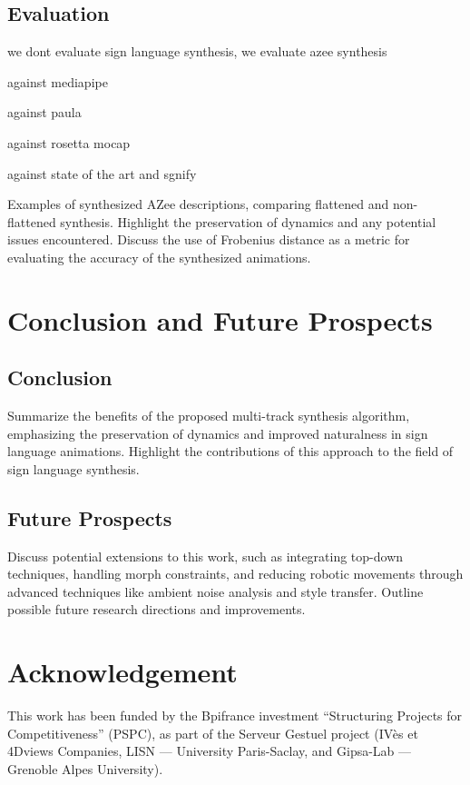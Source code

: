 \documentclass[../../main.tex]{subfiles}
\begin{document}
\subsection{Evaluation}

we dont evaluate sign language synthesis, we evaluate azee synthesis

against mediapipe 

against paula

against rosetta mocap

against state of the art and sgnify

Examples of synthesized AZee descriptions, comparing flattened and non-flattened synthesis. Highlight the preservation of dynamics and any potential issues encountered. Discuss the use of Frobenius distance as a metric for evaluating the accuracy of the synthesized animations.

\section{Conclusion and Future Prospects}

\subsection{Conclusion}
Summarize the benefits of the proposed multi-track synthesis algorithm, emphasizing the preservation of dynamics and improved naturalness in sign language animations. Highlight the contributions of this approach to the field of sign language synthesis.

\subsection{Future Prospects}
Discuss potential extensions to this work, such as integrating top-down techniques, handling morph constraints, and reducing robotic movements through advanced techniques like ambient noise analysis and style transfer. Outline possible future research directions and improvements.

\section{Acknowledgement}
This work has been funded by the Bpifrance investment “Structuring Projects for Competitiveness” (PSPC), as part of the Serveur Gestuel project (IVès et 4Dviews Companies, LISN — University Paris-Saclay, and Gipsa-Lab — Grenoble Alpes University).
\end{document}
